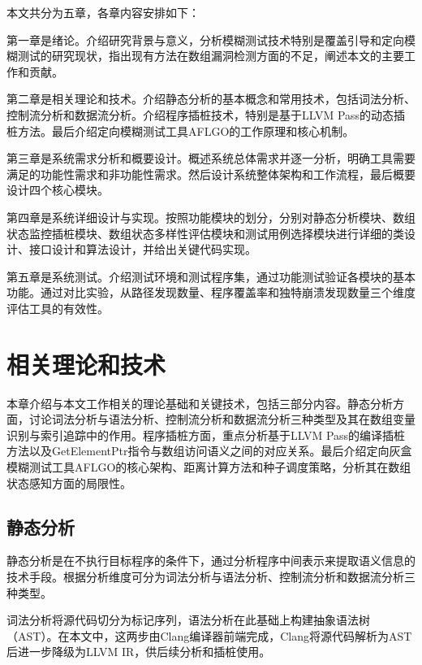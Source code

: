 \documentclass[bachelor]{njupthesis}
\begin{document}
本文共分为五章，各章内容安排如下：

第一章是绪论。介绍研究背景与意义，分析模糊测试技术特别是覆盖引导和定向模糊测试的研究现状，指出现有方法在数组漏洞检测方面的不足，阐述本文的主要工作和贡献。

第二章是相关理论和技术。介绍静态分析的基本概念和常用技术，包括词法分析、控制流分析和数据流分析。介绍程序插桩技术，特别是基于LLVM Pass的动态插桩方法。最后介绍定向模糊测试工具AFLGO的工作原理和核心机制。

第三章是系统需求分析和概要设计。概述系统总体需求并逐一分析，明确工具需要满足的功能性需求和非功能性需求。然后设计系统整体架构和工作流程，最后概要设计四个核心模块。

第四章是系统详细设计与实现。按照功能模块的划分，分别对静态分析模块、数组状态监控插桩模块、数组状态多样性评估模块和测试用例选择模块进行详细的类设计、接口设计和算法设计，并给出关键代码实现。

第五章是系统测试。介绍测试环境和测试程序集，通过功能测试验证各模块的基本功能。通过对比实验，从路径发现数量、程序覆盖率和独特崩溃发现数量三个维度评估工具的有效性。


\chapter{相关理论和技术}

本章介绍与本文工作相关的理论基础和关键技术，包括三部分内容。静态分析方面，讨论词法分析与语法分析、控制流分析和数据流分析三种类型及其在数组变量识别与索引追踪中的作用。程序插桩方面，重点分析基于LLVM Pass的编译插桩方法以及GetElementPtr指令与数组访问语义之间的对应关系。最后介绍定向灰盒模糊测试工具AFLGO的核心架构、距离计算方法和种子调度策略，分析其在数组状态感知方面的局限性。

\section{静态分析}

静态分析是在不执行目标程序的条件下，通过分析程序中间表示来提取语义信息的技术手段\cite{LLVMiris}。根据分析维度可分为词法分析与语法分析、控制流分析和数据流分析三种类型。

词法分析将源代码切分为标记序列，语法分析在此基础上构建抽象语法树（AST）。在本文中，这两步由Clang编译器前端完成，Clang将源代码解析为AST后进一步降级为LLVM IR，供后续分析和插桩使用。
\end{document}
